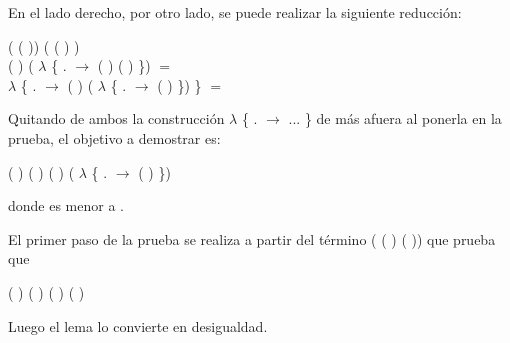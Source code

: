 \begin{AgdaAlign}
En el lado derecho, por otro lado, se puede realizar la siguiente reducción:
\begin{flushright}
(  ( )) \AgdaFunction{+} ( ( ) ) \\
( ) \AgdaFunction{+} ( $\lambda$ \{ . $\rightarrow$  ( ) ( ) \}) $=$ \\
 $\lambda$ \{ . $\rightarrow$ ( ) \AgdaFunction{+} ( $\lambda$ \{ . $\rightarrow$  ( )  \}) \} $=$
\end{flushright}

Quitando de ambos la construcción  $\lambda$ \{ . $\rightarrow$ ... \} de más afuera al ponerla en la prueba, el objetivo a demostrar es: 
\begin{center}
\AgdaFunction{[}  \AgdaFunction{]}  ( ) (  \AgdaFunction{+} ) \AgdaFunction{$\leq$} ( ) \AgdaFunction{+} ( $\lambda$ \{ . $\rightarrow$  ( )  \})
\end{center}
donde  es menor a .

El primer paso de la prueba se realiza a partir del término ( ( )   ( )) que prueba que 
\begin{center}
\AgdaFunction{[}  \AgdaFunction{]}  ( ) (  \AgdaFunction{+} ) \AgdaFunction{$\sim$}  ( ) ( ) 
\end{center}
Luego el lema \AgdaFunction{$\sim\rightarrow\leq$} lo convierte en desigualdad. 


\end{AgdaAlign}

